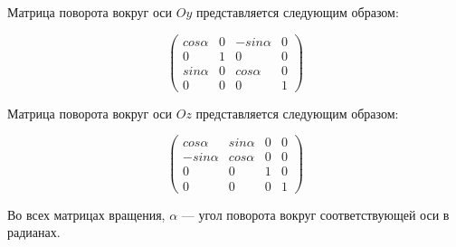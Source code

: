 Матрица поворота вокруг оси $Oy$ представляется следующим образом:

$$
\begin{pmatrix}
    cos \alpha & 0 & -sin \alpha & 0 \\
    0 & 1 & 0 & 0 \\
    sin \alpha & 0 & cos \alpha & 0 \\
    0 & 0 & 0 & 1
\end{pmatrix}
$$

Матрица поворота вокруг оси $Oz$ представляется следующим образом:

$$
\begin{pmatrix}
    cos \alpha & sin \alpha & 0 & 0 \\
    -sin \alpha & cos \alpha & 0 & 0 \\
    0 & 0 & 1 & 0 \\
    0 & 0 & 0 & 1
\end{pmatrix}
$$

Во всех матрицах вращения, $\alpha$ --- угол поворота вокруг соответствующей оси в радианах.